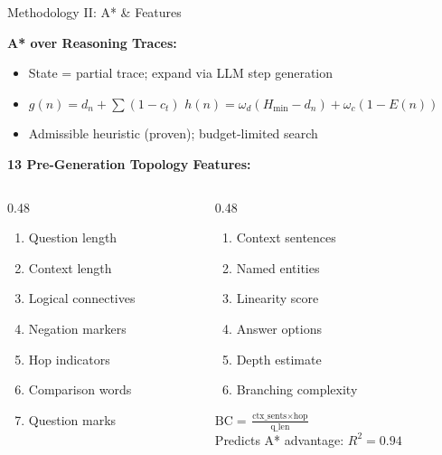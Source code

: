 \documentclass[t]{beamer}
\begin{document}
\begin{frame}{Methodology II: A* \& Features}

\textbf{A* over Reasoning Traces:}
\begin{itemize}\small
    \item State = partial trace; expand via LLM step generation
    \item $g(n) = d_n + \sum(1{-}c_t)$ \quad $h(n) = \omega_d(H_{\min}{-}d_n) + \omega_c(1{-}E(n))$
    \item Admissible heuristic (proven); budget-limited search
\end{itemize}

\vspace{0.3em}
\textbf{13 Pre-Generation Topology Features:}
\begin{columns}[T]
\begin{column}{0.48\textwidth}
\scriptsize
\begin{enumerate}\setlength{\itemsep}{0pt}
    \item Question length
    \item Context length
    \item Logical connectives
    \item Negation markers
    \item Hop indicators
    \item Comparison words
    \item Question marks
\end{enumerate}
\end{column}
\begin{column}{0.48\textwidth}
\scriptsize
\begin{enumerate}\setlength{\itemsep}{0pt}\setcounter{enumi}{7}
    \item Context sentences
    \item Named entities
    \item Linearity score
    \item Answer options
    \item Depth estimate
    \item Branching complexity
\end{enumerate}
\vspace{0.4em}
\normalsize
$\text{BC} = \frac{\text{ctx\_sents} \times \text{hop}}{\text{q\_len}}$\\[0.2em]
{\tiny Predicts A* advantage: $R^2 = 0.94$}
\end{column}
\end{columns}

\end{frame}
\end{document}
